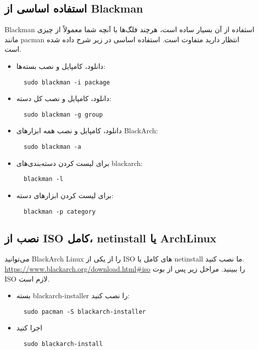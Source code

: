 \documentclass[a4paper, oneside, 11pt]{book}
\begin{document}
\subsection{استفاده اساسی از Blackman} Blackman استفاده از آن بسیار ساده است، هرچند فلگ‌ها با آنچه شما
معمولاً از چیزی مانند pacman انتظار دارید متفاوت است. استفاده اساسی در زیر شرح داده شده است.
\begin{itemize}
\item دانلود، کامپایل و نصب بسته‌ها:
\begin{lstlisting}
  sudo blackman -i package
\end{lstlisting}

\item دانلود، کامپایل و نصب کل دسته:
\begin{lstlisting}
  sudo blackman -g group
\end{lstlisting}

\item دانلود، کامپایل و نصب همه ابزارهای BlackArch:
\begin{lstlisting}
  sudo blackman -a
\end{lstlisting}

\item برای لیست کردن دسته‌بندی‌های blackarch:
\begin{lstlisting}
  blackman -l
\end{lstlisting}

\item برای لیست کردن ابزارهای دسته:
\begin{lstlisting}
  blackman -p category
\end{lstlisting}

\end{itemize}

\subsection{نصب از ISO کامل، netinstall یا ArchLinux}
می‌توانید BlackArch Linux را از یکی از ISO های کامل یا netinstall ما نصب کنید.\\
\url{https://www.blackarch.org/download.html#iso} را ببینید. مراحل زیر پس از
بوت ISO لازم است.
\begin{itemize}
\item بسته blackarch-installer را نصب کنید:
\begin{lstlisting}
  sudo pacman -S blackarch-installer
\end{lstlisting}

\item اجرا کنید
\begin{lstlisting}
  sudo blackarch-install
\end{lstlisting}

\end{itemize}
\end{document}
